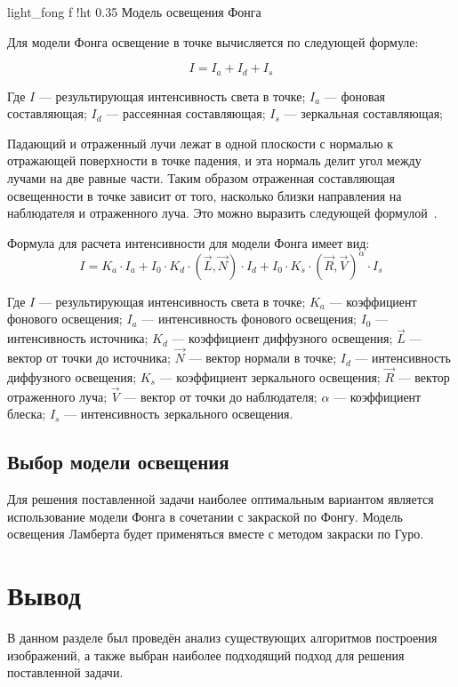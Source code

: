     {light_fong}
    {f}
    {!ht}
    {0.35\textwidth}
    {Модель освещения Фонга}

Для модели Фонга освещение в точке вычисляется по следующей формуле:

\begin{equation}
    I = I_{a} + I_{d} + I_{s}
\end{equation}

Где $I$ --- результирующая интенсивность света в точке; 
$I_{a}$ --- фоновая составляющая; 
$I_{d}$ --- рассеянная составляющая;
$I_{s}$ --- зеркальная составляющая;


Падающий и отраженный лучи лежат в одной плоскости с нормалью к отражающей поверхности в точке падения, и эта нормаль делит угол между лучами на две равные части. 
Таким образом отраженная составляющая освещенности в точке зависит от того, насколько близки направления на наблюдателя и отраженного луча. 
Это можно выразить следующей формулой~\cite{LIGHT}.

Формула для расчета интенсивности для модели Фонга имеет вид:
\begin{equation}
    I = K_a \cdot I_a + I_0 \cdot K_d \cdot (\vec{L}, \vec{N}) \cdot I_d + I_0 \cdot K_s \cdot (\vec{R}, \vec{V})^\alpha \cdot I_s
\end{equation}

Где $I$ --- результирующая интенсивность света в точке; 
$K_a$ --- коэффициент фонового освещения; 
$I_a$ --- интенсивность фонового освещения; 
$I_0$ --- интенсивность источника; 
$K_d$ --- коэффициент диффузного освещения; 
$\vec{L}$ --- вектор от точки до источника; 
$\vec{N}$ --- вектор нормали в точке; 
$I_d$ --- интенсивность диффузного освещения; 
$K_s$ --- коэффициент зеркального освещения; 
$\vec{R}$ --- вектор отраженного луча; 
$\vec{V}$ --- вектор от точки до наблюдателя; 
$\alpha$ --- коэффициент блеска; 
$I_s$ --- интенсивность зеркального освещения.


\subsection{Выбор модели освещения}
Для решения поставленной задачи наиболее оптимальным вариантом является использование модели Фонга в сочетании с закраской по Фонгу.  
Модель освещения Ламберта будет применяться вместе с методом закраски по Гуро.  

\section*{Вывод}

В данном разделе был проведён анализ существующих алгоритмов построения изображений,  
а также выбран наиболее подходящий подход для решения поставленной задачи.  
